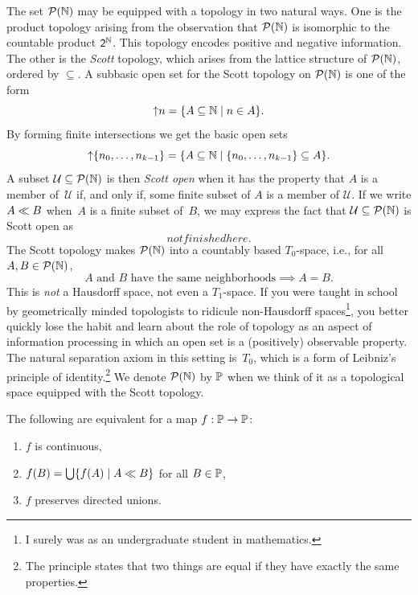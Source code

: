 The set $\mathcal{P}(\mathbb{N})$ may be equipped with a topology in two natural
ways. One is the product topology arising from the observation that
$\mathcal{P}(\mathbb{N})$ is isomorphic to the countable product $\mathsf{2}^{\mathbb{N}}$. This
topology encodes positive and negative information. The other is the
\emph{Scott} topology, which arises from the lattice structure of
$\mathcal{P}(\mathbb{N})$, ordered by $\subseteq$. A subbasic open set for the Scott
topology on $\mathcal{P}(\mathbb{N})$ is one of the form
%
\begin{equation*}
  {\uparrow}n = \{A \subseteq \mathbb{N} \mid n \in A\}.
\end{equation*}
%
By forming finite intersections we get the basic open sets
%
\begin{equation*}
  {\uparrow}\{n_0, \ldots, n_{k-1}\} =
  \{A \subseteq \mathbb{N} \mid \{n_0, \ldots, n_{k-1}\} \subseteq A\}.
\end{equation*}
%
A subset $\mathcal{U} \subseteq \mathcal{P}(\mathbb{N})$ is then \emph{Scott open}
when it has the property that $A$ is a member of~$\mathcal{U}$ if, and
only if, some finite subset of $A$ is a member of $\mathcal{U}$. If we
write $A \ll B$ when~$A$ is a finite subset of~$B$, we may express
the fact that $\mathcal{U} \subseteq \mathcal{P}(\mathbb{N})$ is Scott open as
%
\begin{equation*}
  not finished here.
\end{equation*}
%
The Scott topology makes $\mathcal{P}(\mathbb{N})$ into a countably based
$T_0$-space, i.e., for all $A, B \in \mathcal{P}(\mathbb{N})$,
%
\begin{equation*}
  \text{$A$ and $B$ have the same neighborhoods} \implies A = B.
\end{equation*}
%
This is \emph{not} a Hausdorff space, not even a $T_1$-space. If you
were taught in school by geometrically minded topologists to ridicule
non-Hausdorff spaces\footnote{I surely was as an undergraduate student
  in mathematics.}, you better quickly lose the habit and learn about
the role of topology as an aspect of information processing in which
an open set is a (positively) observable property. The natural
separation axiom in this setting is~$T_0$, which is a form of
Leibniz's principle of identity.\footnote{The principle states that
  two things are equal if they have exactly the same properties.} We
denote $\mathcal{P}(\mathbb{N})$ by $\mathbb{P}$ when we think of it as a topological
space equipped with the Scott topology.

\begin{proposition}
  The following are equivalent for a map $f : \mathbb{P} \to \mathbb{P}$:
  \begin{enumerate}
  \item $f$ is continuous,
  \item $f(B) = \bigcup\nolimits \{f(A) \mid A \ll B\}$ for all $B \in \mathbb{P}$,
  \item $f$ preserves directed unions.
  \end{enumerate}
\end{proposition}

